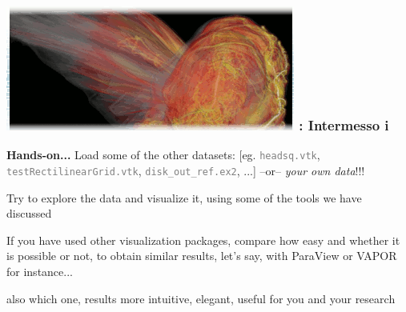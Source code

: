 \handsonEnv
\begin{frame}
\frametitle{\href{https://wci.llnl.gov/simulation/computer-codes/visit/}{\includegraphics[height=.85cm]{figs/visit-logos/VisIt-03}} \hspace{-.85cm}{\bf \textcolor{lightgray}{VisIt}}: Intermesso i}

\begin{beamerboxesrounded}[upper=block head,lower=block body,shadow=true]{\bf Hands-on...}%
        \textcolor{DarkGreen}{} Load some of the other datasets: 
                [eg. {\small \textcolor{gray}{\tt headsq.vtk}, \textcolor{gray}{\tt testRectilinearGrid.vtk}, \textcolor{gray}{\tt disk\_out\_ref.ex2}, ...}]
                --or-- \textit{your own data}!!!

        \pause
        \textcolor{DarkGreen}{} Try to explore the data and visualize it, using some of the tools we have discussed

	\pause
        \textcolor{DarkGreen}{} If you have used other visualization packages, compare how easy and 
                whether it is possible or not, to obtain similar results, let's say, with ParaView or VAPOR for instance...

        \textcolor{DarkGreen}{} also which one, results more intuitive, elegant, useful for you and your research
\end{beamerboxesrounded}


\end{frame}
